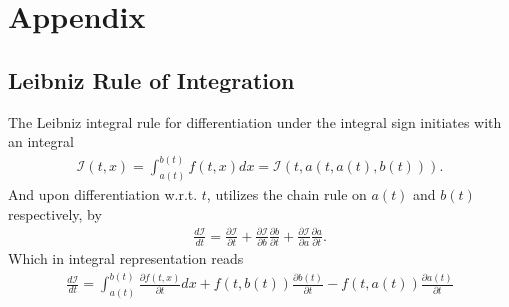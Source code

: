 \appendix
\section{Appendix}
\subsection{Leibniz Rule of Integration}
\label{appendix:leibniz}
The Leibniz integral rule for differentiation under the integral sign
initiates with an integral
\begin{align}
    \mathcal{I}(t, x) = \int_{a(t)}^{b(t)} f(t, x) dx = \mathcal{I}(t, a(t,
    a(t), b(t))).
\end{align}
And upon differentiation w.r.t. $t$, utilizes the chain rule on $a(t)$ and
$b(t)$ respectively, by
\begin{align}
    \frac{d\mathcal{I}}{dt} =
    \frac{\partial \mathcal{I}}{\partial t}+
    \frac{\partial \mathcal{I}}{\partial b}\frac{\partial b}{\partial t}+
    \frac{\partial \mathcal{I}}{\partial a}\frac{\partial a}{\partial t}.
\end{align}
Which in integral representation reads
\begin{align}
    \frac{d\mathcal{I}}{dt} = \int_{a(t)}^{b(t)}\frac{\partial f(t,
    x)}{\partial t} dx + f(t, b(t)) \frac{\partial b(t)}{\partial t}
    - f(t, a(t)) \frac{\partial a(t)}{\partial t}
\end{align}

